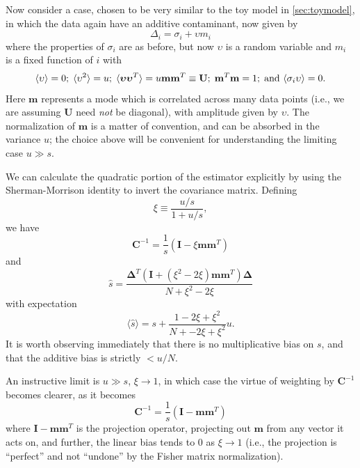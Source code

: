 \documentclass[preprint2,numberedappendix,tighten]{aastex6}  %
\newcommand{\C}{\mathbf{C}}
\newcommand{\F}{\mathbf{F}}
\newcommand{\I}{\mathbf{I}}
\newcommand{\invC}{\ensuremath{\C^{-1}}}
\newcommand{\half}{\ensuremath{\frac{1}{2}}}
\newcommand{\PDeriv}[2]{\ensuremath{\frac{\partial #1}{\partial #2}}}
\begin{document}
Now consider a case, chosen to be very similar to the toy model in \ref{sec:toymodel},  in which the data again have an additive contaminant, now given by
\begin{equation}
\Delta_i = \sigma_i + \upsilon m_i
\end{equation}
where the properties of $\sigma_i$ are as before, but now $\upsilon$ is a random variable and $m_i$ is a fixed function of $i$ with
\begin{equation}
\langle \upsilon \rangle = 0; \;
\langle \upsilon^2 \rangle = u; \; 
 \langle \bm{\upsilon \upsilon}^T \rangle = u \mathbf{m m}^T \equiv \mathbf{U}; \;
 \mathbf{m}^T \mathbf{m} = 1; \; {\rm and}~ 
\langle \sigma_i \upsilon \rangle = 0.
\end{equation}
Here $\mathbf{m}$ represents a mode which is correlated across many data points (i.e., we are assuming $\mathbf{U}$ need {\it not} be diagonal), with amplitude given by  $\upsilon$.  The normalization of $\mathbf{m}$ is a matter of convention, and can be absorbed in the variance $u$; the choice above will be convenient for understanding the limiting case $u \gg s$.

We can calculate the quadratic portion of the estimator explicitly by using the Sherman-Morrison identity to invert the covariance matrix.  Defining
\begin{equation}
\xi \equiv \frac{u/s}{1+u/s},
\end{equation} 
we have
\begin{equation}
\invC  =   \frac{1}{s} \left(\I - \xi \mathbf{m m}^T \right)
\end{equation}
and
\begin{equation}
\hat{s} = 
\frac{ \bm \Delta^T  (\I +  (\xi^2 - 2 \xi)  \mathbf{m m}^T)  \bm \Delta}{N + \xi^2 - 2 \xi} 
\end{equation}
with expectation
\begin{equation}
\langle \hat{s} \rangle = 
s + \frac{1 - 2 \xi + \xi^2}{N + - 2 \xi + \xi^2} u. 
\end{equation}
It is worth observing immediately that there is no multiplicative bias on $s$, and that the additive bias is strictly $< u/N$.

An instructive limit is $u \gg s$, $\xi \to 1$, in which case the virtue of weighting by $\invC$ becomes clearer, as it becomes
\begin{equation}
\invC  = \frac{1}{s} \left(\I - \mathbf{m m}^T \right)
\end{equation}
where $\I - \mathbf{m m}^T$ is the projection operator, projecting out $\mathbf{m}$ from any vector it acts on, and further, the linear bias tends to 0 as $\xi \to 1$ (i.e., the projection is ``perfect'' and not ``undone'' by the Fisher matrix normalization).
\end{document}
